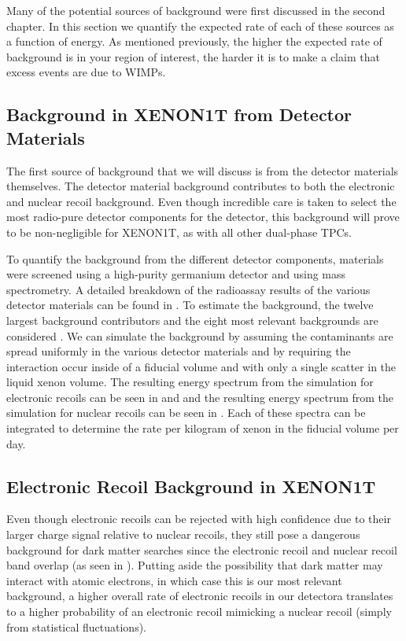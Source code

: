 Many of the potential sources of background were first discussed in the second chapter.  In this section we quantify the expected rate of each of these sources as a function of energy.  As mentioned previously, the higher the expected rate of background is in your region of interest, the harder it is to make a claim that excess events are due to WIMPs.  


\subsection{Background in XENON1T from Detector Materials}
\label{sec:xe1t_materials_bkg}

The first source of background that we will discuss is from the detector materials themselves.  The detector material background contributes to both the electronic and nuclear recoil background.  Even though incredible care is taken to select the most radio-pure detector components for the detector, this background will prove to be non-negligible for XENON1T, as with all other dual-phase TPCs.

To quantify the background from the different detector components, materials were screened using a high-purity germanium detector and using mass spectrometry.  A detailed breakdown of the radioassay results of the various detector materials can be found in .  To estimate the background, the twelve largest background contributors and the eight most relevant backgrounds are considered \cite{aprile2016physics}.  We can simulate the background by assuming the contaminants are spread uniformly in the various detector materials and by requiring the interaction occur inside of a fiducial volume and with only a single scatter in the liquid xenon volume.  The resulting energy spectrum from the simulation for electronic recoils can be seen in  and  and the resulting energy spectrum from the simulation for nuclear recoils can be seen in .  Each of these spectra can be integrated to determine the rate per kilogram of xenon in the fiducial volume per day.


\subsection{Electronic Recoil Background in XENON1T}
\label{sec:xe1t_er_bkg}

Even though electronic recoils can be rejected with high confidence due to their larger charge signal relative to nuclear recoils, they still pose a dangerous background for dark matter searches since the electronic recoil and nuclear recoil band overlap (as seen in ).  Putting aside the possibility that dark matter may interact with atomic electrons, in which case this is our most relevant background, a higher  overall rate of electronic recoils in our detectora translates to a higher probability of an electronic recoil mimicking a nuclear recoil (simply from statistical fluctuations).

